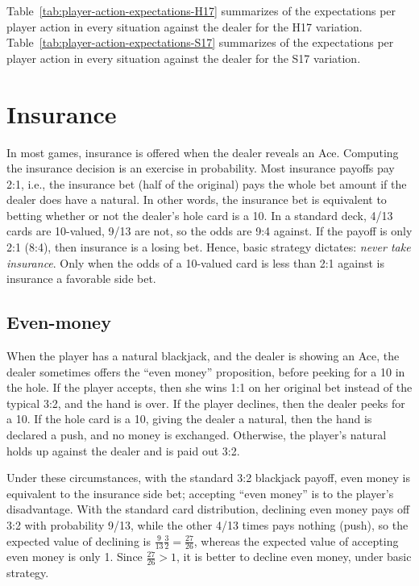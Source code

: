 Table~\ref{tab:player-action-expectations-H17} summarizes of the
expectations per player action in every situation against the dealer
for the H17 variation.
Table~\ref{tab:player-action-expectations-S17} summarizes of the
expectations per player action in every situation against the dealer
for the S17 variation.

\section{Insurance}
\label{sec:basic:insurance}

In most games, insurance is offered when the dealer reveals an Ace.
Computing the insurance decision is an exercise in probability.
Most insurance payoffs pay 2:1, i.e., the insurance bet (half of the original)
pays the whole bet amount if the dealer does have a natural.
In other words, the insurance bet is equivalent to betting 
whether or not the dealer's hole card is a 10.
In a standard deck, 4/13 cards are 10-valued, 9/13 are not, 
so the odds are 9:4 against.  
If the payoff is only 2:1 (8:4), then insurance is a losing bet.
Hence, basic strategy dictates: \emph{never take insurance}.
Only when the odds of a 10-valued card is less than 2:1 against
is insurance a favorable side bet.

\subsection{Even-money}
\label{sec:basic:insurance:even-money}

When the player has a natural blackjack, and the dealer is showing an 
Ace, the dealer sometimes offers the ``even money'' proposition, 
before peeking for a 10 in the hole.
If the player accepts, then she wins 1:1 on her original bet
instead of the typical 3:2, and the hand is over.
If the player declines, then the dealer peeks for a 10.
If the hole card is a 10, giving the dealer a natural, then the hand
is declared a push, and no money is exchanged.
Otherwise, the player's natural holds up against the dealer
and is paid out 3:2.

Under these circumstances, with the standard 3:2 blackjack payoff, 
even money is equivalent to the insurance side bet;
accepting ``even money'' is to the player's disadvantage.
With the standard card distribution, 
declining even money pays off 3:2 with probability 9/13, 
while the other 4/13 times pays nothing (push), 
so the expected value of declining is
$\frac{9}{13}\frac{3}{2}=\frac{27}{26}$,
whereas the expected value of accepting even money is only 1.  
Since $\frac{27}{26}>1$, it is better to decline even money, 
under basic strategy.

